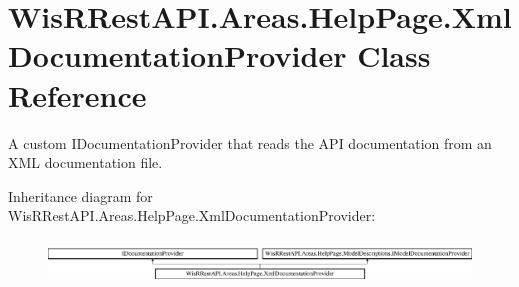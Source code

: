 \hypertarget{class_wis_r_rest_a_p_i_1_1_areas_1_1_help_page_1_1_xml_documentation_provider}{}\section{Wis\+R\+Rest\+A\+P\+I.\+Areas.\+Help\+Page.\+Xml\+Documentation\+Provider Class Reference}
\label{class_wis_r_rest_a_p_i_1_1_areas_1_1_help_page_1_1_xml_documentation_provider}


A custom I\+Documentation\+Provider that reads the A\+P\+I documentation from an X\+M\+L documentation file.  


Inheritance diagram for Wis\+R\+Rest\+A\+P\+I.\+Areas.\+Help\+Page.\+Xml\+Documentation\+Provider\+:\begin{figure}[H]
\begin{center}
\leavevmode
\includegraphics[height=1.186441cm]{class_wis_r_rest_a_p_i_1_1_areas_1_1_help_page_1_1_xml_documentation_provider}
\end{center}
\end{figure}
